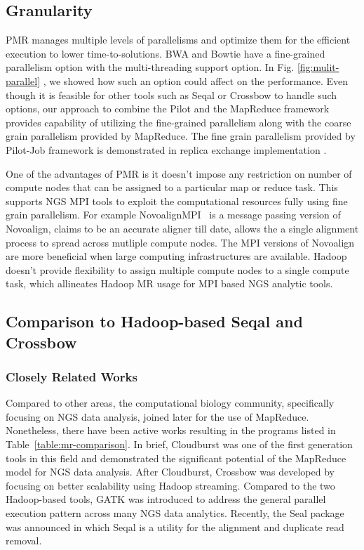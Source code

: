 \documentclass{acm_proc_article-sp}
\begin{document}
\subsection{Granularity} 
PMR manages multiple levels of parallelisms and optimize them for the efficient execution to lower time-to-solutions. BWA and Bowtie have a fine-grained parallelism option with the multi-threading support option.   In Fig. \ref{fig:mulit-parallel}  , we showed how such an option could affect on the performance.  
Even though it is feasible for other tools such as Seqal or Crossbow to handle such options, our approach to combine the Pilot and the MapReduce framework provides capability of utilizing the fine-grained parallelism along with the coarse grain parallelism provided by MapReduce. The fine grain parallelism provided by Pilot-Job framework is demonstrated in replica exchange implementation \cite{repex_ptrsa}.  

One of the advantages of PMR is it doesn't impose any restriction on number of compute nodes that can be assigned to a particular map or reduce task. This supports NGS MPI tools to exploit the  computational resources fully using fine grain parallelism. For example NovoalignMPI~\cite{novo-align} is a message passing version of Novoalign, claims to be an accurate aligner till date,  allows the a single alignment process to spread across mutliple compute nodes. The MPI versions of Novoalign are more beneficial when large computing infrastructures are available. Hadoop doesn't provide flexibility to assign multiple compute nodes to a single compute task, which allineates Hadoop MR usage for MPI based NGS analytic tools.

\subsection{Comparison to Hadoop-based Seqal and Crossbow}
\subsubsection{Closely Related Works}
Compared to other areas, the computational biology community, specifically focusing on NGS data analysis, joined later for the use of MapReduce\cite{cloudburst}.  Nonetheless, there have been active works resulting in the programs listed in Table~\ref{table:mr-comparison}.  In brief, Cloudburst was one of the first generation tools in this field and  demonstrated the significant potential of the MapReduce model for NGS data analysis.  After Cloudburst, Crossbow was developed by focusing on better scalability using Hadoop streaming.  Compared to the two Hadoop-based tools, GATK was introduced to address the general parallel execution pattern across many NGS data analytics.  Recently, the Seal package was announced in which Seqal is a utility for the alignment and duplicate read removal.   
\end{document}
